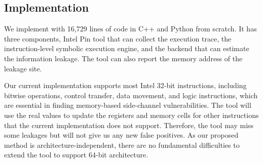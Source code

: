 \subsection{Implementation}
We implement \tool{} with 16,729 lines of code in C++ and Python from scratch. It has three
components, Intel Pin tool that can collect the execution trace, the
instruction-level symbolic execution engine, and the backend that can estimate
the information leakage. 
The tool can also report the memory address of the leakage site. 

Our current implementation supports most Intel 32-bit instructions,
including bitwise operations, control transfer, data movement, and logic
instructions, which are essential in finding memory-based side-channel
vulnerabilities. The tool will use the real values to update the registers and memory
cells for other instructions that the current implementation does not support. 
Therefore, the tool may miss some leakages but will not give us any new false positives. 
As our proposed method is architecture-independent,
there are no fundamental difficulties to extend the tool to support 64-bit
architecture. 

